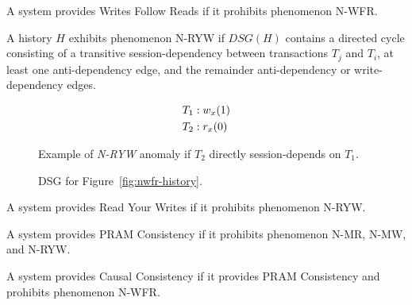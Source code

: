 \begin{definition}
A system provides Writes Follow Reads if it prohibits phenomenon N-WFR.
\end{definition}

\begin{definition}
A history $H$ exhibits phenomenon N-RYW if $DSG(H)$ contains a directed cycle
consisting of a transitive session-dependency between transactions
$T_j$ and $T_i$, at least one anti-dependency edge, and the remainder
anti-dependency or write-dependency edges.
\end{definition}


\begin{figure}[H]
\begin{align*}
\small
T_1 &: w_x(1)\\
T_2 &: r_x(0)\\
\end{align*}
\caption{Example of \textit{N-RYW} anomaly if $T_2$ directly session-depends on $T_1$.}
\label{fig:nryw-history}
\end{figure}

\begin{figure}[H]
\centering
{}
\caption{DSG for Figure~\ref{fig:nwfr-history}.}
\label{fig:nryw-dsg}
\end{figure}

\begin{definition}
A system provides Read Your Writes if it prohibits phenomenon N-RYW.
\end{definition}

\begin{definition}
A system provides PRAM Consistency if it prohibits phenomenon N-MR,
N-MW, and N-RYW.
\end{definition}

\begin{definition}
A system provides Causal Consistency if it provides PRAM Consistency
and prohibits phenomenon N-WFR.
\end{definition}

